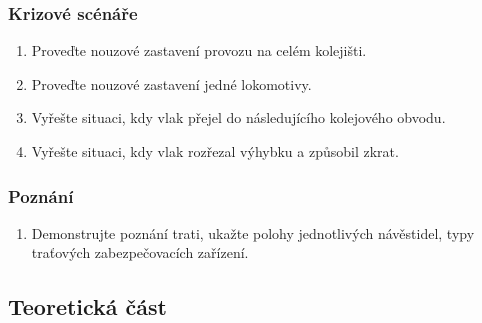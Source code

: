 \documentclass[12pt,a4paper]{article}
\begin{document}
\subsubsection*{Krizové scénáře}
\begin{enumerate}[leftmargin=*]
\item Proveďte nouzové zastavení provozu na celém kolejišti.
\item Proveďte nouzové zastavení jedné lokomotivy.
\item Vyřešte situaci, kdy vlak přejel do následujícího kolejového obvodu.
\item Vyřešte situaci, kdy vlak rozřezal výhybku a způsobil zkrat.
\end{enumerate}

\subsubsection*{Poznání}
\begin{enumerate}[leftmargin=*]
\item Demonstrujte poznání trati, ukažte polohy jednotlivých návěstidel, typy
traťových zabezpečovacích zařízení.
\end{enumerate}


\subsection{Teoretická část}
\end{document}
